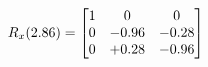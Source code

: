 \documentclass[preview]{standalone}
\begin{document}
\begin{align*}
\special{dvisvgm:raw <g id='unique000'>}R_{x}(2.86) = \begin{bmatrix}1 & 0 & 0 \\0 & -0.96 & -0.28 \\0 & +0.28 & -0.96\end{bmatrix}\special{dvisvgm:raw </g>}
\end{align*}
\end{document}
